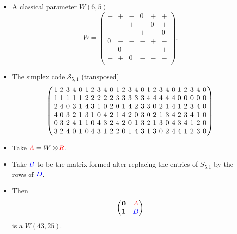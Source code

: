 \documentclass{beamer}
\newcommand{\RR}[1]{\textcolor{red}{#1}}
\newcommand{\BB}[1]{\textcolor{blue}{#1}}
\begin{document}
\begin{frame}

  \begin{itemize}
  \item A classical parameter $W(6,5)$
    \[
      W =
      \begin{pmatrix}
        -&+&-&0&+&+\\
        -&-&+&-&0&+\\
        -&-&-&+&-&0\\
        0&-&-&-&+&-\\
        +&0&-&-&-&+\\
        -&+&0&-&-&-\\
      \end{pmatrix}.
    \]
  \item The simplex code $\mathcal{S}_{5,1}$ (transposed)
    \[
      \left(
        \arraycolsep=2.0pt\def\arraystretch{1.0}
        \begin{array}{ccccccccccccccccccccccccc}
          1&2&3&4&0&1&2&3&4&0&1&2&3&4&0&1&2&3&4&0&1&2&3&4&0\\
          1&1&1&1&1&2&2&2&2&2&3&3&3&3&3&4&4&4&4&4&0&0&0&0&0\\
          2&4&0&3&1&4&3&1&0&2&0&1&4&2&3&3&0&2&1&4&1&2&3&4&0\\
          4&0&3&2&1&3&1&0&4&2&1&4&2&0&3&0&2&1&3&4&2&3&4&1&0\\
          0&3&2&4&1&1&0&4&3&2&4&2&0&1&3&2&1&3&0&4&3&4&1&2&0\\
          3&2&4&0&1&0&4&3&1&2&2&0&1&4&3&1&3&0&2&4&4&1&2&3&0\\
        \end{array}
      \right)
    \]
  \end{itemize}
  
\end{frame}

\begin{frame}

  \begin{itemize}
  \item Take $\RR{A}=W \otimes \RR{R}$.
  \item Take $\BB{B}$ to be the matrix formed after replacing the entries of
    $S_{5,1}$ by the rows of $\BB{D}$.
  \item Then
    \[
      \begin{pmatrix}
        \textbf{0} & \RR{A} \\
        \textbf{1} & \BB{B}
      \end{pmatrix}
    \]
    is a $W(43,25)$.
  \end{itemize}
  
\end{frame}
\end{document}
